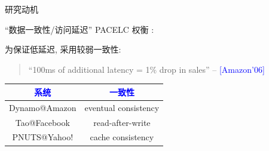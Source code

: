 \begin{frame}{研究动机}
  \vspace{0.30cm}

  ``数据一致性/访问延迟'' PACELC 权衡 :



  为保证低延迟, 采用较弱一致性:
  \begin{quote}
    ``{\small 100ms of additional latency = 1\% drop in sales}'' \hfill -- {\scriptsize 
      \textcolor{blue}{[Amazon'06]}} \end{quote}

  {\small
  \begin{table}
    \begin{tabular}{c|c}
      \hline
      \textcolor{blue}{\bf 系统} & \textcolor{blue}{\bf 一致性}		\\ \hline
      Dynamo@Amazon & eventual consistency \\ \hline
      Tao@Facebook & read-after-write \\ \hline
      PNUTS@Yahoo! & cache consistency \\ \hline
    \end{tabular}
  \end{table}
  }
\end{frame}


